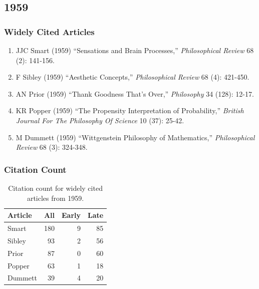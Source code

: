\documentclass[
  10pt,
  letterpaper,
  DIV=11,
  numbers=noendperiod,
  twoside]{scrartcl}
\providecommand{\tightlist}{%
  \setlength{\itemsep}{0pt}\setlength{\parskip}{0pt}}\usepackage{longtable,booktabs,array}
\begin{document}
\newpage

\subsection{1959}\label{sec-s1959}

\subsubsection*{Widely Cited Articles}\label{widely-cited-articles-3}

\begin{enumerate}
\def\labelenumi{\arabic{enumi}.}
\tightlist
\item
  JJC Smart (1959) ``Sensations and Brain Processes,''
  \emph{Philosophical Review} 68 (2): 141-156.
\item
  F Sibley (1959) ``Aesthetic Concepts,'' \emph{Philosophical Review} 68
  (4): 421-450.
\item
  AN Prior (1959) ``Thank Goodness That's Over,'' \emph{Philosophy} 34
  (128): 12-17.
\item
  KR Popper (1959) ``The Propensity Interpretation of Probability,''
  \emph{British Journal For The Philosophy Of Science} 10 (37): 25-42.
\item
  M Dummett (1959) ``Wittgenstein Philosophy of Mathematics,''
  \emph{Philosophical Review} 68 (3): 324-348.
\end{enumerate}

\subsubsection*{Citation Count}\label{sec-count-1959}

\begin{longtable}[]{@{}lrrr@{}}

\caption{\label{tbl-citation-count-1959}Citation count for widely cited
articles from 1959.}

\tabularnewline

\toprule\noalign{}
Article & All & Early & Late \\
\midrule\noalign{}
\endhead
\bottomrule\noalign{}
\endlastfoot
Smart & 180 & 9 & 85 \\
Sibley & 93 & 2 & 56 \\
Prior & 87 & 0 & 60 \\
Popper & 63 & 1 & 18 \\
Dummett & 39 & 4 & 20 \\

\end{longtable}
\end{document}

